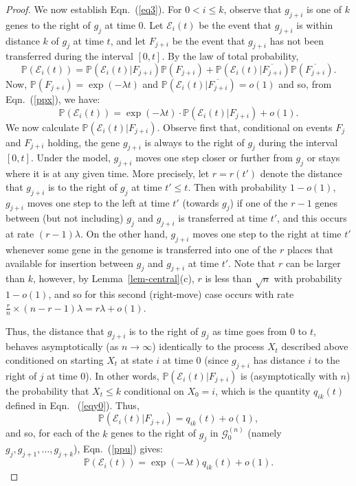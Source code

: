 \documentclass[runningheads, 11pt]{llncs}
\newcommand{\cE}{\mathcal{E}}
\newcommand{\PP}{\mathbb{P}}
\newcommand{\G}{\mathcal{G}^{(n)}}
\begin{document}
\begin{proof}
We now establish Eqn.~(\ref{eq3}). For $0< i\leq k$, observe that $g_{j+i}$ is
one of $k$ genes to the right of $g_j$ at time 0. Let $\cE_i(t)$ be the event
that $g_{j+i}$ is within distance $k$ of $g_j$ at time $t$, and let $F_{j+i}$ be
the event that $g_{j+i}$ has not been transferred during the interval $[0,t]$.
By the law of total probability,
\begin{equation}
\label{ppx}
\PP(\cE_i(t)) = \PP(\cE_i(t)|F_{j+i})\PP(F_{j+i}) +
\PP(\cE_i(t)|\overline{F_{j+i}})\PP(\overline{F_{j+i}}).
\end{equation}
Now, $\PP(F_{j+i}) = \exp(-\lambda t)$ and $\PP(\cE_i(t)|\overline{F_{j+i}}) =
o(1)$ and so, from Eqn.~(\ref{ppx}), we have: 
\begin{equation}
\label{ppu}
\PP(\cE_i(t)) = \exp(-\lambda t) \cdot\PP(\cE_i(t)|F_{j+i}) +o(1).
\end{equation}
We now calculate $\PP(\cE_i(t)|F_{j+i})$. Observe first that, conditional on
events $F_j$ and $F_{j+i}$ holding, the gene $g_{j+i}$ is always to the right of
$g_j$ during the interval $[0,t]$. Under the model, $g_{j+i}$ moves one step
closer or further from $g_j$ or stays where it is at any given time. More
precisely, let $r = r(t')$ denote the distance that $g_{j+i}$ is to the right of
$g_j$ at time $t' \leq t$. Then with probability $1-o(1)$, $g_{j+i}$ moves one
step to the left at time $t'$ (towards $g_j$) if one of the $r-1$ genes between
(but not including) $g_j$ and $g_{j+i}$ is transferred at time $t'$, and this
occurs at rate $(r-1)\lambda$. On the other hand, $g_{j+i}$ moves one step to
the right at time $t'$ whenever some gene in the genome is transferred into one
of the $r$ places that available for insertion between $g_j$ and $g_{j+i}$ at
time $t'$. Note that $r$ can be larger than $k$, however, by
Lemma~\ref{lem-central}(c), $r$ is less than $\sqrt{n}$ with probability
$1-o(1)$, and so for this second (right-move) case occurs with rate $\frac{r}{n}
\times (n-r-1)\lambda = r\lambda +o(1)$. 

Thus, the distance that $g_{j+i}$ is to the right of $g_j$ as time goes from $0$
to $t$, behaves asymptotically (as $n \rightarrow \infty$) identically to the
process $X_t$ described above conditioned on starting $X_t$ at state $i$ at time
0 (since $g_{j+i}$ has distance $i$ to the right of $j$ at time 0). In other
words, $\PP(\cE_i(t)|F_{j+i})$ is (asymptotically with $n$) the probability that
$X_t \leq k$ conditional on $X_0=i$, which is the quantity $q_{ik}(t)$ defined
in Eqn. ~(\ref{eqy0}). Thus, $$\PP(\cE_i(t)|F_{j+i}) = q_{ik}(t) +o(1),$$ and
so, for each of the $k$ genes to the right of $g_j$ in $\G_0$ (namely $g_j,
g_{j+1}, \ldots, g_{j+k}$), Eqn.~(\ref{ppu}) gives: $$\PP(\cE_i(t)) =
\exp(-\lambda t)q_{ik}(t) + o(1).$$



\end{proof}
\end{document}
